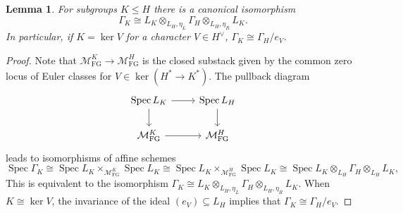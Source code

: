 \documentclass[11pt,reqno]{amsart}
\newtheorem{lemma}[lemma]{Lemma}
\newcommand{\Spec}{\operatorname{Spec}}
\newcommand{\MFG}{\mathcal M_{\mathrm{FG}}}
\newcommand{\tensor}{\otimes}
\begin{document}
\begin{lemma}\label{lem:closed-basechange}
For subgroups $K\leq H$ there is a canonical isomorphism
\[
  \Gamma_K\cong L_K\tensor_{L_H,\eta_L}\Gamma_H \tensor_{L_H,\eta_R}L_K.
\]
In particular, if $K=\ker V$ for a character $V\in H^\vee$, $\Gamma_K\cong \Gamma_H/e_V$. 
\end{lemma}
\begin{proof}
Note that $\MFG^K\to\MFG^H$ is the closed substack given by the common zero locus of Euler classes for $V\in \ker(H^*\to K^*)$. The pullback diagram
\[
\begin{tikzcd}
    \Spec L_K \arrow[r]\arrow[d] & \Spec L_H \arrow[d]  \\
    \MFG^K \arrow[r] &\MFG^H  
\end{tikzcd}
\]
leads to isomorphisms of affine schemes
\[ 
  \Spec \Gamma_K \cong \Spec L_K \times_{\MFG^K} \Spec L_K \cong \Spec L_K \times_{\MFG^H} \Spec L_K \cong \Spec L_K\tensor_{L_H}\Gamma_H \tensor_{L_H}L_K,
\]
This is equivalent to the isomorphism $\Gamma_K\cong L_K\tensor_{L_H,\eta_L}\Gamma_H \tensor_{L_H,\eta_R}L_K$. When $K\cong \ker V$, the invariance of the ideal $(e_V)\subseteq L_H$ implies that $\Gamma_K\cong\Gamma_H/e_V$.
\end{proof}
\end{document}
